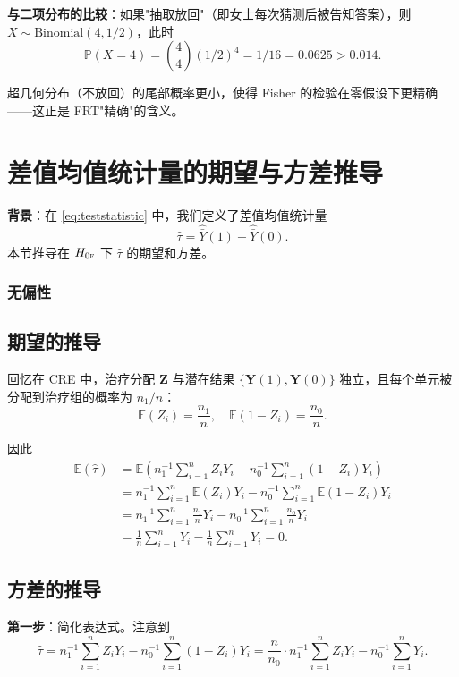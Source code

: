 \textbf{与二项分布的比较}：如果"抽取放回"（即女士每次猜测后被告知答案），则 $X \sim \text{Binomial}(4, 1/2)$，此时
\[
\mathbb{P}(X = 4) = \binom{4}{4} (1/2)^4 = 1/16 = 0.0625 > 0.014 .
\]

超几何分布（不放回）的尾部概率更小，使得 Fisher 的检验在零假设下更精确——这正是 FRT"精确"的含义。

\section{差值均值统计量的期望与方差推导}\label{sec:tau-hat-variance-derivation}

\textbf{背景}：在 \cref{eq:teststatistic} 中，我们定义了差值均值统计量
\[
\hat{\tau} = \hat{\bar{Y}}(1) - \hat{\bar{Y}}(0) .
\]
本节推导在 $H_{0\textsc{f}}$ 下 $\hat{\tau}$ 的期望和方差。

\subsubsection*{无偏性}\label{sec:appendix-neyman-unbiased}

\subsection*{期望的推导}

回忆在 CRE 中，治疗分配 $\mathbf{Z}$ 与潜在结果 $\{\mathbf{Y}(1), \mathbf{Y}(0)\}$ 独立，且每个单元被分配到治疗组的概率为 $n_1/n$：
\[
\mathbb{E}(Z_i) = \frac{n_1}{n}, \quad \mathbb{E}(1 - Z_i) = \frac{n_0}{n} .
\]

因此
\begin{align*}
\mathbb{E}(\hat{\tau})
&= \mathbb{E}\left( n_1^{-1} \sum_{i=1}^n Z_i Y_i - n_0^{-1} \sum_{i=1}^n (1 - Z_i) Y_i \right) \\
&= n_1^{-1} \sum_{i=1}^n \mathbb{E}(Z_i) Y_i - n_0^{-1} \sum_{i=1}^n \mathbb{E}(1 - Z_i) Y_i \\
&= n_1^{-1} \sum_{i=1}^n \frac{n_1}{n} Y_i - n_0^{-1} \sum_{i=1}^n \frac{n_0}{n} Y_i \\
&= \frac{1}{n} \sum_{i=1}^n Y_i - \frac{1}{n} \sum_{i=1}^n Y_i = 0 .
\end{align*}

\subsection*{方差的推导}\label{sec:appendix-neyman-var}

\textbf{第一步}：简化表达式。注意到
\[
\hat{\tau} = n_1^{-1} \sum_{i=1}^n Z_i Y_i - n_0^{-1} \sum_{i=1}^n (1 - Z_i) Y_i = \frac{n}{n_0} \cdot n_1^{-1} \sum_{i=1}^n Z_i Y_i - n_0^{-1} \sum_{i=1}^n Y_i .
\]

